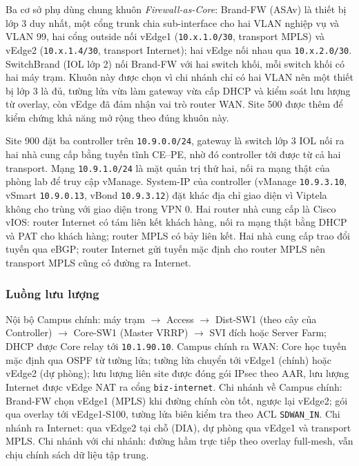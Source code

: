 Ba cơ sở phụ dùng chung khuôn \textit{Firewall-as-Core}: Brand-FW (ASAv) là thiết bị lớp 3 duy nhất, một cổng trunk chia sub-interface cho hai VLAN nghiệp vụ và VLAN 99, hai cổng outside nối vEdge1 (\texttt{10.x.1.0/30}, transport MPLS) và vEdge2 (\texttt{10.x.1.4/30}, transport Internet); hai vEdge nối nhau qua \texttt{10.x.2.0/30}. SwitchBrand (IOL lớp 2) nối Brand-FW với hai switch khối, mỗi switch khối có hai máy trạm. Khuôn này được chọn vì chi nhánh chỉ có hai VLAN nên một thiết bị lớp 3 là đủ, tường lửa vừa làm gateway vừa cấp DHCP và kiểm soát lưu lượng từ overlay, còn vEdge đã đảm nhận vai trò router WAN. Site 500 được thêm để kiểm chứng khả năng mở rộng theo đúng khuôn này.

Site 900 đặt ba controller trên \texttt{10.9.0.0/24}, gateway là switch lớp 3 IOL nối ra hai nhà cung cấp bằng tuyến tĩnh CE--PE, nhờ đó controller tới được từ cả hai transport. Mạng \texttt{10.9.1.0/24} là mặt quản trị thứ hai, nối ra mạng thật của phòng lab để truy cập vManage. System-IP của controller (vManage \texttt{10.9.3.10}, vSmart \texttt{10.9.0.13}, vBond \texttt{10.9.3.12}) đặt khác địa chỉ giao diện vì Viptela không cho trùng với giao diện trong VPN 0. Hai router nhà cung cấp là Cisco vIOS: router Internet có tám liên kết khách hàng, nối ra mạng thật bằng DHCP và PAT cho khách hàng; router MPLS có bảy liên kết. Hai nhà cung cấp trao đổi tuyến qua eBGP; router Internet gửi tuyến mặc định cho router MPLS nên transport MPLS cũng có đường ra Internet.

\subsubsection{Luồng lưu lượng}

Nội bộ Campus chính: máy trạm $\rightarrow$ Access $\rightarrow$ Dist-SW1 (theo cây của Controller) $\rightarrow$ Core-SW1 (Master VRRP) $\rightarrow$ SVI đích hoặc Server Farm; DHCP được Core relay tới \texttt{10.1.90.10}. Campus chính ra WAN: Core học tuyến mặc định qua OSPF từ tường lửa; tường lửa chuyển tới vEdge1 (chính) hoặc vEdge2 (dự phòng); lưu lượng liên site được đóng gói IPsec theo AAR, lưu lượng Internet được vEdge NAT ra cổng \texttt{biz-internet}. Chi nhánh về Campus chính: Brand-FW chọn vEdge1 (MPLS) khi đường chính còn tốt, ngược lại vEdge2; gói qua overlay tới vEdge1-S100, tường lửa biên kiểm tra theo ACL \texttt{SDWAN\_IN}. Chi nhánh ra Internet: qua vEdge2 tại chỗ (DIA), dự phòng qua vEdge1 và transport MPLS. Chi nhánh với chi nhánh: đường hầm trực tiếp theo overlay full-mesh, vẫn chịu chính sách dữ liệu tập trung.


